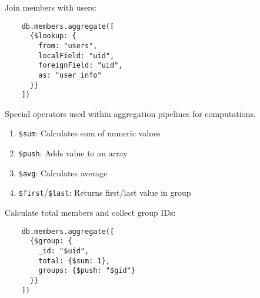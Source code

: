 \begin{example}
  Join members with users:
  \begin{lstlisting}
    db.members.aggregate([
      {$lookup: {
        from: "users",
        localField: "uid",
        foreignField: "uid",
        as: "user_info"
      }}
    ])
  \end{lstlisting}
\end{example}

\begin{definition}
  Special operators used within aggregation pipelines for computations.
  \begin{enumerate}
    \item \texttt{\$sum}: Calculates sum of numeric values
    \item \texttt{\$push}: Adds value to an array
    \item \texttt{\$avg}: Calculates average
    \item \texttt{\$first}/\texttt{\$last}: Returns first/last value in group
  \end{enumerate}
\end{definition}

\begin{example}
  Calculate total members and collect group IDs:
  \begin{lstlisting}
    db.members.aggregate([
      {$group: {
        _id: "$uid",
        total: {$sum: 1},
        groups: {$push: "$gid"}
      }}
    ])
  \end{lstlisting}
\end{example}

